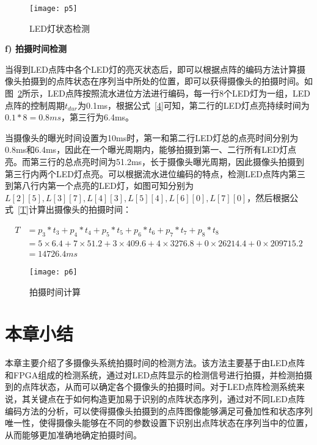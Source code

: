 \begin{figure}[h] 
  \centering
  \texttt{[image: p5]}
  \caption{LED灯状态检测}
  \label{p5}
\end{figure}

\textbf{f) 拍摄时间检测}

当得到LED点阵中各个LED灯的亮灭状态后，即可以根据点阵的编码方法计算摄像头拍摄到的点阵状态在序列当中所处的位置，即可以获得摄像头的拍摄时间。如图~\ref{p6}所示，LED点阵按照流水进位方法进行编码，每一行8个LED灯为一组，LED点阵的控制周期$t_{dur}$为0.1ms，根据公式~\ref{4}可知，第二行的LED灯点亮持续时间为$0.1 * 8 = 0.8ms$，第三行为6.4ms。

当摄像头的曝光时间设置为10ms时，第一和第二行LED灯总的点亮时间分别为0.8ms和6.4ms，因此在一个曝光周期内，能够拍摄到第一、二行所有LED灯点亮。而第三行的总点亮时间为51.2ms，长于摄像头曝光周期，因此摄像头拍摄到第三行内两个LED灯点亮。可以根据流水进位编码的特点，检测LED点阵内第三到第八行内第一个点亮的LED灯，如图可知分别为$L[2][5], L[3][7], L[4][3], L[5][4], L[6][0], L[7][0]$，然后根据公式~\ref{T}计算出摄像头的拍摄时间：

\begin{equation}
\begin{split}
T &= p_3 * t_3 +p_4 * t_4 +p_5 * t_5 +p_6 * t_6 +p_7 * t_7 +p_8 * t_8\\
&=5 \times 6.4 + 7 \times 51.2  +3\times 409.6 + 4\times3276.8  +0\times26214.4  +0\times209715.2\\
&=14726.4 ms
\end{split}
\end{equation}


\begin{figure}[h] 
  \centering
  \texttt{[image: p6]}
  \caption{拍摄时间计算}
  \label{p6}
\end{figure}

\section{本章小结}
本章主要介绍了多摄像头系统拍摄时间的检测方法。该方法主要基于由LED点阵和FPGA组成的检测系统，通过对LED点阵显示的检测信号进行拍摄，并检测拍摄到的点阵状态，从而可以确定各个摄像头的拍摄时间。对于LED点阵检测系统来说，其关键点在于如何构造更加易于识别的点阵状态序列，通过对不同LED点阵编码方法的分析，可以使得摄像头拍摄到的点阵图像能够满足可叠加性和状态序列唯一性，使得摄像头能够在不同的参数设置下识别出点阵状态在序列当中的位置，从而能够更加准确地确定拍摄时间。


